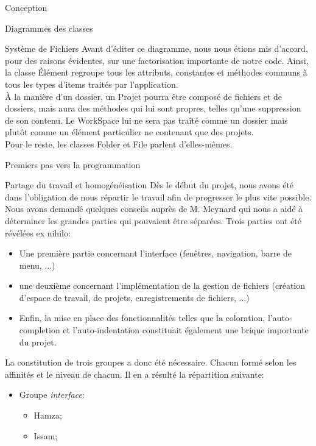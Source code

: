 \documentclass[a4paper, 12pt]{report}
\begin{document}
\begin{part}{Conception}
\begin{chapter}{Diagrammes des classes}
\begin{section}{Système de Fichiers}
				Avant d'éditer ce diagramme, nous nous étions mis d'accord, pour des raisons évidentes, sur une factorisation importante de 
				notre code. Ainsi, la classe Élément regroupe tous les attributs, constantes et méthodes communs à tous les types d'items 
				traités par l'application.\\
				À la manière d'un dossier, un Projet pourra être composé de fichiers et de dossiers, mais aura des méthodes qui lui sont propres,
				telles qu'une suppression de son contenu. Le WorkSpace lui ne sera pas traîté comme un dossier mais plutôt comme un élément
				particulier ne contenant que des projets.\\
				Pour le reste, les classes Folder et File parlent d'elles-mêmes.
			\end{section}
		\end{chapter}
		\begin{chapter}{Premiers pas vers la programmation}
			\begin{section}{Partage du travail et homogénéisation}
				Dès le début du projet, nous avons été dans l'obligation de nous répartir le travail afin de progresser le plus vite possible.
				Nous avons demandé quelques conseils auprès de M. Meynard qui nous a aidé à déterminer les grandes parties qui pouvaient 
				être séparées. Trois parties ont été révélées ex nihilo:\\
				\begin{itemize}
					\item Une première partie concernant l'interface (fenêtres, navigation, barre de menu, ...)
					\item une deuxième concernant l'implémentation de la gestion de fichiers (création d'espace de travail, de projets,
					enregistrements de fichiers, ...)
					\item Enfin, la mise en place des fonctionnalités telles que la coloration, l'auto-completion et l'auto-indentation
					constituait également une brique importante du projet.
				\end{itemize}
				La constitution de trois groupes a donc été nécessaire. Chacun formé selon les 
				affinités et le niveau de chacun. Il en a résulté la répartition suivante:\\
				\begin{itemize}
					\item Groupe \emph{interface}:
						\begin{itemize}
							\item Hamza;
							\item Issam;

\end{itemize}
\end{itemize}
\end{section}
\end{chapter}
\end{part}
\end{document}
